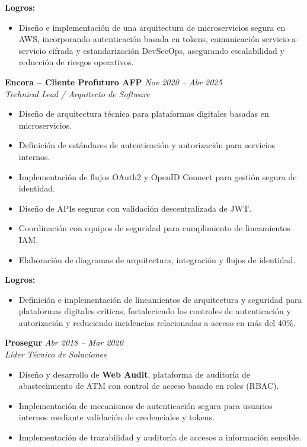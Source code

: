 \documentclass[11pt,a4paper]{article}
\begin{document}
\textbf{Logros:}
\begin{itemize}[leftmargin=*]
    \item Diseño e implementación de una arquitectura de microservicios segura en AWS, incorporando autenticación basada en tokens, comunicación servicio-a-servicio cifrada y estandarización DevSecOps, asegurando escalabilidad y reducción de riesgos operativos.

\end{itemize}

\vspace{6pt}

\textbf{Encora – Cliente Profuturo AFP} \hfill \textit{Nov 2020 – Abr 2025}\\
\textit{Technical Lead / Arquitecto de Software}

\begin{itemize}[leftmargin=*]
  \item Diseño de arquitectura técnica para plataformas digitales basadas en microservicios.
  \item Definición de estándares de autenticación y autorización para servicios internos.
  \item Implementación de flujos OAuth2 y OpenID Connect para gestión segura de identidad.
  \item Diseño de APIs seguras con validación descentralizada de JWT.
  \item Coordinación con equipos de seguridad para cumplimiento de lineamientos IAM.
  \item Elaboración de diagramas de arquitectura, integración y flujos de identidad.
\end{itemize}


\textbf{Logros:}
\begin{itemize}[leftmargin=*]
    \item Definición e implementación de lineamientos de arquitectura y seguridad para plataformas digitales críticas, fortaleciendo los controles de autenticación y autorización y reduciendo incidencias relacionadas a acceso en más del 40\%.

\end{itemize}

\vspace{6pt}

\textbf{Prosegur} \hfill \textit{Abr 2018 – Mar 2020}\\
\textit{Líder Técnico de Soluciones}

\begin{itemize}[leftmargin=*]
  \item Diseño y desarrollo de \textbf{Web Audit}, plataforma de auditoría de abastecimiento de ATM con control de acceso basado en roles (RBAC).
  \item Implementación de mecanismos de autenticación segura para usuarios internos mediante validación de credenciales y tokens.
  \item Implementación de trazabilidad y auditoría de accesos a información sensible.
\end{itemize}
\end{document}
